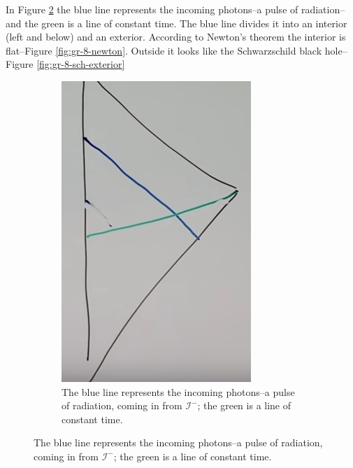 \documentclass[]{article}
\begin{document}
{In Figure \ref{fig:gr-8-incoming-shell} the blue line represents the incoming photons--a pulse of radiation--and the green is a line of constant time. The blue line divides it into an interior (left and below) and an exterior. According to Newton's theorem the interior is flat--Figure \ref{fig:gr-8-newton}. Outside it looks like the Schwarzschild black hole--Figure \ref{fig:gr-8-sch-exterior}
\begin{figure}[H]
	\caption{Penrose-Carter diagram for Incoming Shell}
	\begin{subfigure}{0.3\textwidth}
		\caption{The blue line represents the incoming photons--a pulse of radiation, coming in from $\mathscr{I}^-$; the green is a line of constant time.}\label{fig:gr-8-incoming-shell}
		\includegraphics[width=\textwidth]{gr-8-incoming-shell}

\end{subfigure}
\end{figure}}
\end{document}
